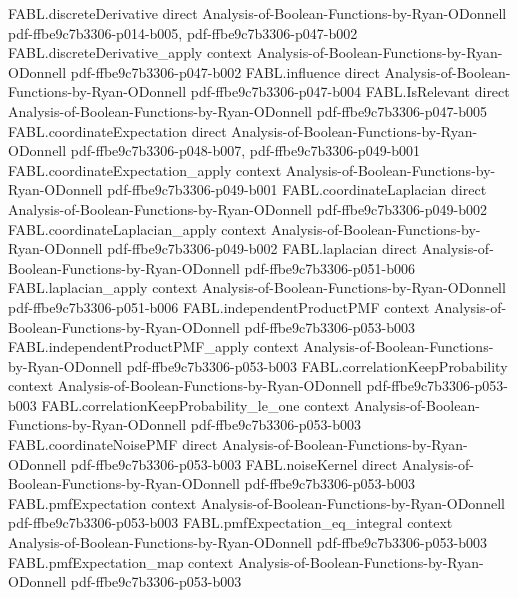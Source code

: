 \begin{theorem}
\proofstep
  {FABL.discreteDerivative}
  {direct}
  {Analysis-of-Boolean-Functions-by-Ryan-ODonnell}
  {pdf-ffbe9c7b3306-p014-b005,
    pdf-ffbe9c7b3306-p047-b002}
\proofstep
  {FABL.discreteDerivative_apply}
  {context}
  {Analysis-of-Boolean-Functions-by-Ryan-ODonnell}
  {pdf-ffbe9c7b3306-p047-b002}
\proofstep
  {FABL.influence}
  {direct}
  {Analysis-of-Boolean-Functions-by-Ryan-ODonnell}
  {pdf-ffbe9c7b3306-p047-b004}
\proofstep
  {FABL.IsRelevant}
  {direct}
  {Analysis-of-Boolean-Functions-by-Ryan-ODonnell}
  {pdf-ffbe9c7b3306-p047-b005}
\proofstep
  {FABL.coordinateExpectation}
  {direct}
  {Analysis-of-Boolean-Functions-by-Ryan-ODonnell}
  {pdf-ffbe9c7b3306-p048-b007,
    pdf-ffbe9c7b3306-p049-b001}
\proofstep
  {FABL.coordinateExpectation_apply}
  {context}
  {Analysis-of-Boolean-Functions-by-Ryan-ODonnell}
  {pdf-ffbe9c7b3306-p049-b001}
\proofstep
  {FABL.coordinateLaplacian}
  {direct}
  {Analysis-of-Boolean-Functions-by-Ryan-ODonnell}
  {pdf-ffbe9c7b3306-p049-b002}
\proofstep
  {FABL.coordinateLaplacian_apply}
  {context}
  {Analysis-of-Boolean-Functions-by-Ryan-ODonnell}
  {pdf-ffbe9c7b3306-p049-b002}
\proofstep
  {FABL.laplacian}
  {direct}
  {Analysis-of-Boolean-Functions-by-Ryan-ODonnell}
  {pdf-ffbe9c7b3306-p051-b006}
\proofstep
  {FABL.laplacian_apply}
  {context}
  {Analysis-of-Boolean-Functions-by-Ryan-ODonnell}
  {pdf-ffbe9c7b3306-p051-b006}
\proofstep
  {FABL.independentProductPMF}
  {context}
  {Analysis-of-Boolean-Functions-by-Ryan-ODonnell}
  {pdf-ffbe9c7b3306-p053-b003}
\proofstep
  {FABL.independentProductPMF_apply}
  {context}
  {Analysis-of-Boolean-Functions-by-Ryan-ODonnell}
  {pdf-ffbe9c7b3306-p053-b003}
\proofstep
  {FABL.correlationKeepProbability}
  {context}
  {Analysis-of-Boolean-Functions-by-Ryan-ODonnell}
  {pdf-ffbe9c7b3306-p053-b003}
\proofstep
  {FABL.correlationKeepProbability_le_one}
  {context}
  {Analysis-of-Boolean-Functions-by-Ryan-ODonnell}
  {pdf-ffbe9c7b3306-p053-b003}
\proofstep
  {FABL.coordinateNoisePMF}
  {direct}
  {Analysis-of-Boolean-Functions-by-Ryan-ODonnell}
  {pdf-ffbe9c7b3306-p053-b003}
\proofstep
  {FABL.noiseKernel}
  {direct}
  {Analysis-of-Boolean-Functions-by-Ryan-ODonnell}
  {pdf-ffbe9c7b3306-p053-b003}
\proofstep
  {FABL.pmfExpectation}
  {context}
  {Analysis-of-Boolean-Functions-by-Ryan-ODonnell}
  {pdf-ffbe9c7b3306-p053-b003}
\proofstep
  {FABL.pmfExpectation_eq_integral}
  {context}
  {Analysis-of-Boolean-Functions-by-Ryan-ODonnell}
  {pdf-ffbe9c7b3306-p053-b003}
\proofstep
  {FABL.pmfExpectation_map}
  {context}
  {Analysis-of-Boolean-Functions-by-Ryan-ODonnell}
  {pdf-ffbe9c7b3306-p053-b003}

\end{theorem}
